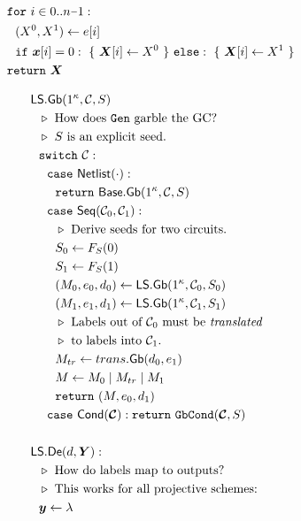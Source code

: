 \begin{figure}
\begin{adjustwidth}{-0.1\textwidth}{-0.1\textwidth}
\begin{minipage}[t]{0.56\linewidth}
\begin{align*}
      &~~\cfor~i \in 0..n\minus 1:\\
      &~~~~(X^0, X^1) \gets e[i]\\
      &~~~~\cif~\cirinp[i] = 0:~\{~\gcirinp[i] \gets X^0~\}~\celse:~\{~\gcirinp[i] \gets X^1~\}\\
      &~~\creturn~\gcirinp
    \end{align*}
  \end{minipage}
  \begin{minipage}[t]{0.40\linewidth}
    \begin{align*}
      &\ourscheme.\gGb(1^\kappa, \cir, S)\\
      &~~\codecomment{How does \G garble the GC?}\\
      &~~\codecomment{$S$ is an explicit seed.}\\
      &~~\switch~\cir:\\
      &~~~~\ccase~\netlist(\cdot):\\
      &~~~~~~\creturn~\underscheme.\gGb(1^\kappa,\cir,S)\\
      &~~~~\ccase~\sequential(\cir_0, \cir_1):\\
      &~~~~~~\codecomment{Derive seeds for two circuits.}\\
      &~~~~~~S_0 \gets F_S(0)\\
      &~~~~~~S_1 \gets F_S(1)\\
      &~~~~~~(\mat_0, e_0, d_0) \gets \ourscheme.\gGb(1^\kappa,\cir_0, S_0)\\
      &~~~~~~(\mat_1, e_1, d_1) \gets \ourscheme.\gGb(1^\kappa,\cir_1, S_1)\\
      &~~~~~~\codecomment{Labels out of $\cir_0$ must be \emph{translated}}\\
      &~~~~~~\codecomment{to labels into $\cir_1$.}\\
      &~~~~~~\mat_{tr} \gets \gbtranslate(d_0,e_1)\\
      &~~~~~~\mat \gets \mat_0\mid \mat_{tr}\mid \mat_1\\
      &~~~~~~\creturn~(\mat, e_0, d_1)\\
      &~~~~\ccase~\conditional(\vec \cir): \creturn~\gbcond(\vec \cir, S)\\
      \\
      &\ourscheme.\gDe(d, \gcirout):\\
      &~~\codecomment{How do labels map to outputs?}\\
      &~~\codecomment{This works for all projective schemes:}\\
      &~~\cirout \gets \lambda\\

\end{align*}
\end{minipage}
\end{adjustwidth}
\end{figure}
